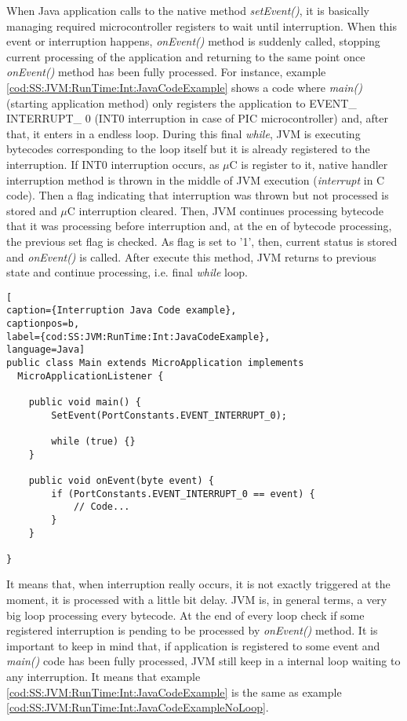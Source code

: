 When Java application calls to the native method \textit{setEvent()}, it is basically managing required microcontroller registers to wait until interruption. When this event or interruption happens, \textit{onEvent()} method is suddenly called, stopping current processing of the application and returning to the same point once \textit{onEvent()} method has been fully processed. For instance, example \ref{cod:SS:JVM:RunTime:Int:JavaCodeExample} shows a code where \textit{main()} (starting application method) only registers the application to EVENT\_ INTERRUPT\_ 0 (INT0 interruption in case of PIC microcontroller) and, after that, it enters in a endless loop. During this final \textit{while}, JVM is executing bytecodes corresponding to the loop itself but it is already registered to the interruption. If INT0 interruption occurs, as $\mu$C is register to it, native handler interruption method is thrown in the middle of JVM execution (\textit{interrupt} in C code). Then a flag indicating that interruption was thrown but not processed is stored and $\mu$C interruption cleared. Then, JVM continues processing bytecode that it was processing before interruption and, at the en of bytecode processing, the previous set flag is checked. As flag is set to '1', then, current status is stored and \textit{onEvent()} is called. After execute this method, JVM returns to previous state and continue processing, i.e. final \textit{while} loop.

\medskip
\begin{lstlisting}[
caption={Interruption Java Code example},
captionpos=b,
label={cod:SS:JVM:RunTime:Int:JavaCodeExample},
language=Java]
public class Main extends MicroApplication implements
  MicroApplicationListener {

    public void main() {
        SetEvent(PortConstants.EVENT_INTERRUPT_0);

        while (true) {}
    }

    public void onEvent(byte event) {
        if (PortConstants.EVENT_INTERRUPT_0 == event) {
            // Code...
        }
    }

}
\end{lstlisting}
\medskip

It means that, when interruption really occurs, it is not exactly triggered at the moment, it is processed with a little bit delay. JVM is, in general terms, a very big loop processing every bytecode. At the end of every loop check if some registered interruption is pending to be processed by \textit{onEvent()} method. It is important to keep in mind that, if application is registered to some event and \textit{main()} code has been fully processed, JVM still keep in a internal loop waiting to any interruption. It means that example \ref{cod:SS:JVM:RunTime:Int:JavaCodeExample} is the same as example \ref{cod:SS:JVM:RunTime:Int:JavaCodeExampleNoLoop}.

